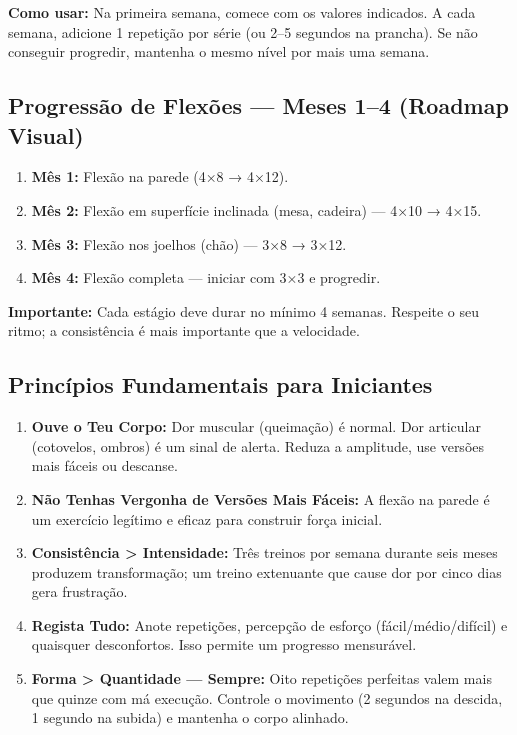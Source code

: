 \documentclass[12pt,a4paper]{scrartcl}
\begin{document}
\textbf{Como usar:} Na primeira semana, comece com os valores indicados. A cada semana, adicione 1 repetição por série (ou 2–5 segundos na prancha). Se não conseguir progredir, mantenha o mesmo nível por mais uma semana.

\subsection{Progressão de Flexões — Meses 1–4 (Roadmap Visual)}
\begin{enumerate}
    \item \textbf{Mês 1:} Flexão na parede (4×8 → 4×12).
    \item \textbf{Mês 2:} Flexão em superfície inclinada (mesa, cadeira) — 4×10 → 4×15.
    \item \textbf{Mês 3:} Flexão nos joelhos (chão) — 3×8 → 3×12.
    \item \textbf{Mês 4:} Flexão completa — iniciar com 3×3 e progredir.
\end{enumerate}
\textbf{Importante:} Cada estágio deve durar no mínimo 4 semanas. Respeite o seu ritmo; a consistência é mais importante que a velocidade.

\subsection{Princípios Fundamentais para Iniciantes}
\begin{enumerate}[label=\arabic*., leftmargin=*]
    \item \textbf{Ouve o Teu Corpo:} Dor muscular (queimação) é normal. Dor articular (cotovelos, ombros) é um sinal de alerta. Reduza a amplitude, use versões mais fáceis ou descanse.
    \item \textbf{Não Tenhas Vergonha de Versões Mais Fáceis:} A flexão na parede é um exercício legítimo e eficaz para construir força inicial.
    \item \textbf{Consistência > Intensidade:} Três treinos por semana durante seis meses produzem transformação; um treino extenuante que cause dor por cinco dias gera frustração.
    \item \textbf{Regista Tudo:} Anote repetições, percepção de esforço (fácil/médio/difícil) e quaisquer desconfortos. Isso permite um progresso mensurável.
    \item \textbf{Forma > Quantidade — Sempre:} Oito repetições perfeitas valem mais que quinze com má execução. Controle o movimento (2 segundos na descida, 1 segundo na subida) e mantenha o corpo alinhado.
\end{enumerate}
\end{document}
